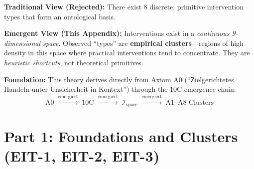 
\begin{tcolorbox}[colback=red!5!white, colframe=red!75!black,
    title=\textbf{Paradigm Shift: From Primitive Types to Emergent Space}]

\textbf{Traditional View (Rejected):} There exist 8 discrete, primitive intervention types that form an ontological basis.

\textbf{Emergent View (This Appendix):} Interventions exist in a \textit{continuous 9-dimensional space}. Observed ``types'' are \textbf{empirical clusters}---regions of high density in this space where practical interventions tend to concentrate. They are \textit{heuristic shortcuts}, not theoretical primitives.

\textbf{Foundation:} This theory derives directly from Axiom A0 (``Zielgerichtetes Handeln unter Unsicherheit in Kontext'') through the 10C emergence chain:
\begin{equation}
\text{A0} \;\xrightarrow{\text{emergiert}}\; \text{10C} \;\xrightarrow{\text{emergiert}}\; \mathcal{I}_{\text{space}} \;\xrightarrow{\text{emergiert}}\; \text{A1--A8 Clusters}
\end{equation}
\end{tcolorbox}


\section{Part 1: Foundations and Clusters (EIT-1, EIT-2, EIT-3)}
\label{sec:ie-part1-foundations}

